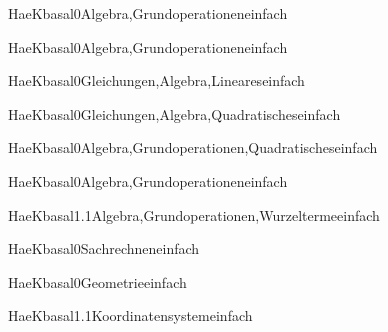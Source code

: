 \documentclass[12pt]{article}
\begin{document}
\begin{Add}{HaeK}{basal0}{Algebra,Grundoperationen}{einfach}
\end{Add}

\begin{Add}{HaeK}{basal0}{Algebra,Grundoperationen}{einfach}
\end{Add}

\begin{Add}{HaeK}{basal0}{Gleichungen,Algebra,Lineares}{einfach}
      
\end{Add}

\begin{Add}{HaeK}{basal0}{Gleichungen,Algebra,Quadratisches}{einfach}
      
\end{Add}

\begin{Add}{HaeK}{basal0}{Algebra,Grundoperationen,Quadratisches}{einfach}
\end{Add}

\begin{Add}{HaeK}{basal0}{Algebra,Grundoperationen}{einfach}
\end{Add}

\begin{Add}{HaeK}{basal1.1}{Algebra,Grundoperationen,Wurzelterme}{einfach}
\end{Add}

\begin{Add}{HaeK}{basal0}{Sachrechnen}{einfach}
\end{Add}

\begin{Add}{HaeK}{basal0}{Geometrie}{einfach}
\end{Add}

\begin{Add}{HaeK}{basal1.1}{Koordinatensystem}{einfach}
\end{Add}
\end{document}
